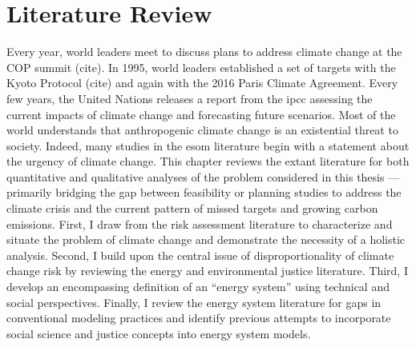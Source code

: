 \chapter{Literature Review}
Every year, world leaders meet to discuss plans to address climate change at the
COP summit (cite). In 1995, world leaders established a set of targets with the
Kyoto Protocol (cite) and again with the 2016 Paris Climate Agreement. Every few
years, the United Nations releases a report from the \ac{ipcc} assessing the
current impacts of climate change and forecasting future scenarios. Most of the
world understands that anthropogenic climate change is an existential threat to
society. Indeed, many studies in the \ac{esom} literature begin with a statement
about the urgency of climate change. This chapter reviews the extant literature
for both quantitative and qualitative analyses of the problem considered in this
thesis --- primarily bridging the gap between feasibility or planning studies to
address the climate crisis and the current pattern of missed targets and growing
carbon emissions. First, I draw from the risk assessment literature to
characterize and situate the problem of climate change and demonstrate the
necessity of a holistic analysis. Second, I build upon the central issue of
disproportionality of climate change risk by reviewing the energy and
environmental justice literature. Third, I develop an encompassing definition of
an ``energy system'' using technical and social perspectives. Finally, I review
the energy system literature for gaps in conventional modeling practices and
identify previous attempts to incorporate social science and justice concepts
into energy system models.



% 
% 
% 




